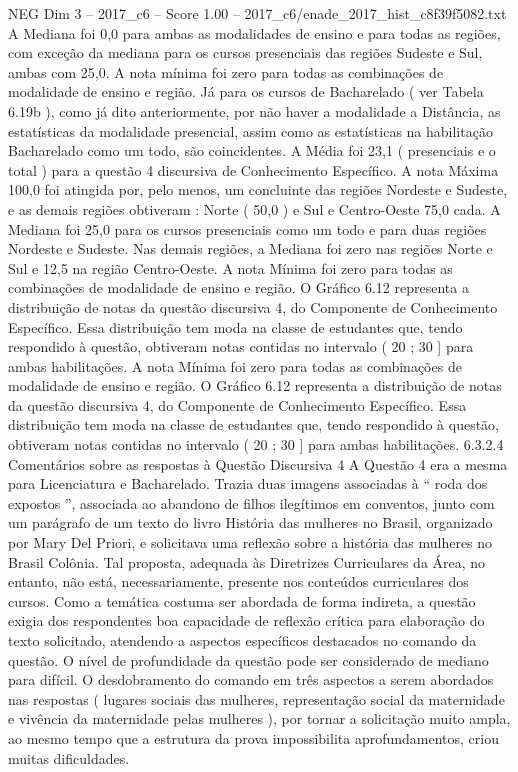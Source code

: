 \begin{textsample}{NEG Dim 3 – 2017\_c6 – Score 1.00 – 2017\_c6/enade\_2017\_hist\_c8f39f5082.txt}
A Mediana foi 0,0 para ambas as modalidades de ensino e para todas as regiões, com exceção da mediana para os cursos presenciais das regiões Sudeste e Sul, ambas com 25,0.
A nota mínima foi zero para todas as combinações de modalidade de ensino e região.
Já para os cursos de Bacharelado ( ver Tabela 6.19b ), como já dito anteriormente, por não haver a modalidade a Distância, as estatísticas da modalidade presencial, assim como as estatísticas na habilitação Bacharelado como um todo, são coincidentes.
A Média foi 23,1 ( presenciais e o total ) para a questão 4 discursiva de Conhecimento Específico.
A nota Máxima 100,0 foi atingida por, pelo menos, um concluinte das regiões Nordeste e Sudeste, e as demais regiões obtiveram : Norte ( 50,0 ) e Sul e Centro-Oeste 75,0 cada.
A Mediana foi 25,0 para os cursos presenciais como um todo e para duas regiões Nordeste e Sudeste.
Nas demais regiões, a Mediana foi zero nas regiões Norte e Sul e 12,5 na região Centro-Oeste.
A nota Mínima foi zero para todas as combinações de modalidade de ensino e região.
O Gráfico 6.12 representa a distribuição de notas da questão discursiva 4, do Componente de Conhecimento Específico.
Essa distribuição tem moda na classe de estudantes que, tendo respondido à questão, obtiveram notas contidas no intervalo ( 20 ; 30 ] para ambas habilitações.
A nota Mínima foi zero para todas as combinações de modalidade de ensino e região.
O Gráfico 6.12 representa a distribuição de notas da questão discursiva 4, do Componente de Conhecimento Específico.
Essa distribuição tem moda na classe de estudantes que, tendo respondido à questão, obtiveram notas contidas no intervalo ( 20 ; 30 ] para ambas habilitações. 6.3.2.4 Comentários sobre as respostas à Questão Discursiva 4 A Questão 4 era a mesma para Licenciatura e Bacharelado.
Trazia duas imagens associadas à “ roda dos expostos ”, associada ao abandono de filhos ilegítimos em conventos, junto com um parágrafo de um texto do livro História das mulheres no Brasil, organizado por Mary Del Priori, e solicitava uma reflexão sobre a história das mulheres no Brasil Colônia.
Tal proposta, adequada às Diretrizes Curriculares da Área, no entanto, não está, necessariamente, presente nos conteúdos curriculares dos cursos.
Como a temática costuma ser abordada de forma indireta, a questão exigia dos respondentes boa capacidade de reflexão crítica para elaboração do texto solicitado, atendendo a aspectos específicos destacados no comando da questão.
O nível de profundidade da questão pode ser considerado de mediano para difícil.
O desdobramento do comando em três aspectos a serem abordados nas respostas ( lugares sociais das mulheres, representação social da maternidade e vivência da maternidade pelas mulheres ), por tornar a solicitação muito ampla, ao mesmo tempo que a estrutura da prova impossibilita aprofundamentos, criou muitas dificuldades.

\end{textsample}
